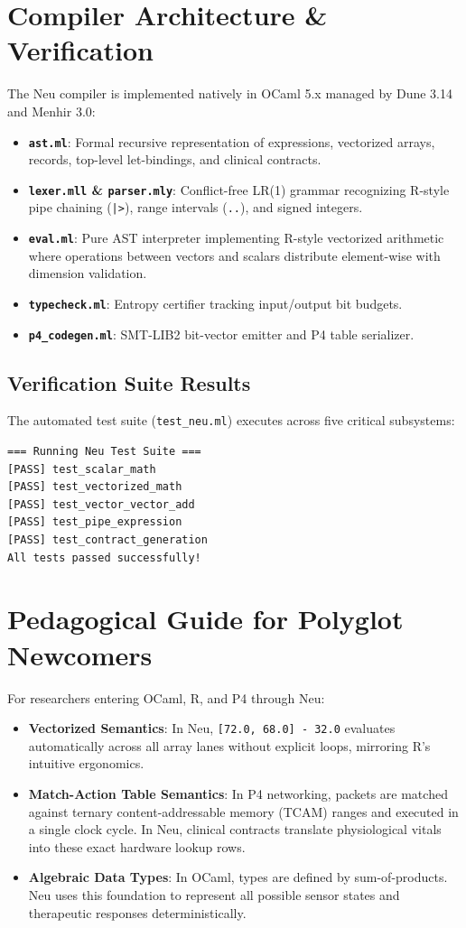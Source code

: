\documentclass[11pt]{article}
\begin{document}
\section{Compiler Architecture \& Verification}

The Neu compiler is implemented natively in OCaml 5.x managed by Dune 3.14 and Menhir 3.0:
\begin{itemize}
    \item \textbf{\texttt{ast.ml}}: Formal recursive representation of expressions, vectorized arrays, records, top-level let-bindings, and clinical contracts.
    \item \textbf{\texttt{lexer.mll} \& \texttt{parser.mly}}: Conflict-free LR(1) grammar recognizing R-style pipe chaining (\texttt{|>}), range intervals (\texttt{..}), and signed integers.
    \item \textbf{\texttt{eval.ml}}: Pure AST interpreter implementing R-style vectorized arithmetic where operations between vectors and scalars distribute element-wise with dimension validation.
    \item \textbf{\texttt{typecheck.ml}}: Entropy certifier tracking input/output bit budgets.
    \item \textbf{\texttt{p4\_codegen.ml}}: SMT-LIB2 bit-vector emitter and P4 table serializer.
\end{itemize}

\subsection{Verification Suite Results}
The automated test suite (\texttt{test\_neu.ml}) executes across five critical subsystems:
\begin{verbatim}
=== Running Neu Test Suite ===
[PASS] test_scalar_math
[PASS] test_vectorized_math
[PASS] test_vector_vector_add
[PASS] test_pipe_expression
[PASS] test_contract_generation
All tests passed successfully!
\end{verbatim}

\section{Pedagogical Guide for Polyglot Newcomers}

For researchers entering OCaml, R, and P4 through Neu:
\begin{itemize}
    \item \textbf{Vectorized Semantics}: In Neu, \texttt{[72.0, 68.0] - 32.0} evaluates automatically across all array lanes without explicit loops, mirroring R's intuitive ergonomics.
    \item \textbf{Match-Action Table Semantics}: In P4 networking, packets are matched against ternary content-addressable memory (TCAM) ranges and executed in a single clock cycle. In Neu, clinical contracts translate physiological vitals into these exact hardware lookup rows.
    \item \textbf{Algebraic Data Types}: In OCaml, types are defined by sum-of-products. Neu uses this foundation to represent all possible sensor states and therapeutic responses deterministically.
\end{itemize}
\end{document}
